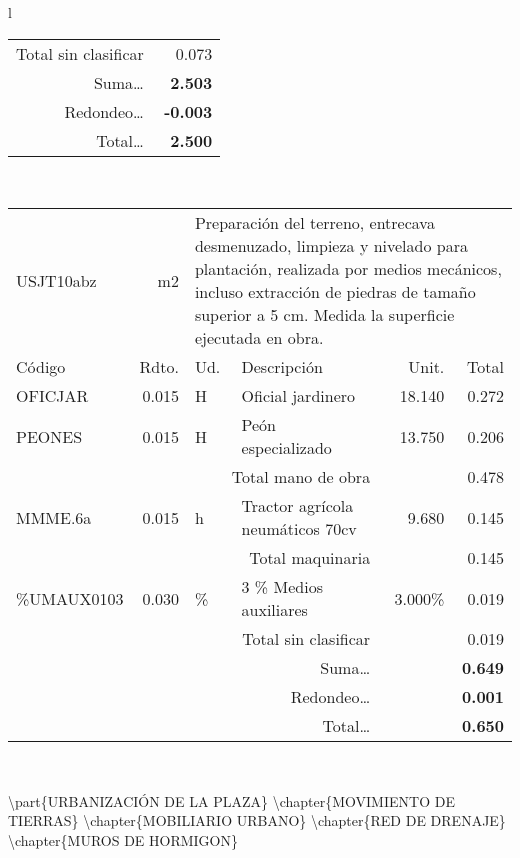 \documentclass{book}%
\begin{document}
\begin{longtable}{l}
\begin{tabular}{l r l p{4cm} r r}
\multicolumn{4}{r}{Total sin clasificar}&&0.073\\%
\multicolumn{4}{r}{Suma\ldots}&\multicolumn{2}{r}{\textbf{2.503}}\\%
\multicolumn{4}{r}{Redondeo\ldots}&\multicolumn{2}{r}{\textbf{{-}0.003}}\\%
\multicolumn{4}{r}{Total\ldots}&\multicolumn{2}{r}{\textbf{2.500}}\\%
\end{tabular}\\%
\begin{tabular}{l r l p{4cm} r r}%
USJT10abz&m2&\multicolumn{4}{p{7cm}}{Preparación del terreno, entrecava desmenuzado, limpieza y nivelado para plantación, realizada por medios mecánicos, incluso extracción de piedras de tamaño superior a 5 cm. Medida la superficie ejecutada en obra.}\\%
Código&Rdto.&Ud.&Descripción&Unit.&Total\\%
\hline%
OFICJAR&0.015&H&Oficial jardinero&18.140&0.272\\%
PEONES&0.015&H&Peón especializado&13.750&0.206\\%
\multicolumn{4}{r}{Total mano de obra}&&0.478\\%
MMME.6a&0.015&h&Tractor agrícola neumáticos 70cv&9.680&0.145\\%
\multicolumn{4}{r}{Total maquinaria}&&0.145\\%
\%UMAUX0103&0.030&\%&3 \% Medios auxiliares&3.000\%&0.019\\%
\multicolumn{4}{r}{Total sin clasificar}&&0.019\\%
\multicolumn{4}{r}{Suma\ldots}&\multicolumn{2}{r}{\textbf{0.649}}\\%
\multicolumn{4}{r}{Redondeo\ldots}&\multicolumn{2}{r}{\textbf{0.001}}\\%
\multicolumn{4}{r}{Total\ldots}&\multicolumn{2}{r}{\textbf{0.650}}\\%
\end{tabular}\\%
\end{longtable}%
\normalsize%
\textbackslash{}part\{URBANIZACIÓN DE LA PLAZA\}\newline%
%
\textbackslash{}chapter\{MOVIMIENTO DE TIERRAS\}\newline%
%
\textbackslash{}chapter\{MOBILIARIO URBANO\}\newline%
%
\textbackslash{}chapter\{RED DE DRENAJE\}\newline%
%
\textbackslash{}chapter\{MUROS DE HORMIGON\}\newline%
\end{document}
